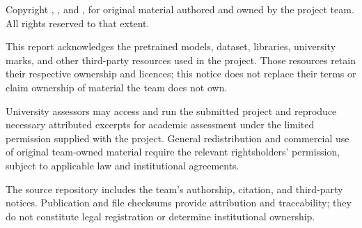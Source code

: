 \noindent Copyright \textcopyright{} \SubmissionYear{} \TeamMemberOne,
\TeamMemberTwo, and \TeamMemberThree, for original material authored and owned
by the project team. All rights reserved to that extent.

This report acknowledges the pretrained models, dataset, libraries, university
marks, and other third-party resources used in the project. Those resources
retain their respective ownership and licences; this notice does not replace
their terms or claim ownership of material the team does not own.

University assessors may access and run the submitted project and reproduce
necessary attributed excerpts for academic assessment under the limited
permission supplied with the project. General redistribution and commercial
use of original team-owned material require the relevant rightsholders'
permission, subject to applicable law and institutional agreements.

The source repository includes the team's authorship, citation, and third-party
notices. Publication and file checksums provide attribution and traceability;
they do not constitute legal registration or determine institutional ownership.
\clearpage
